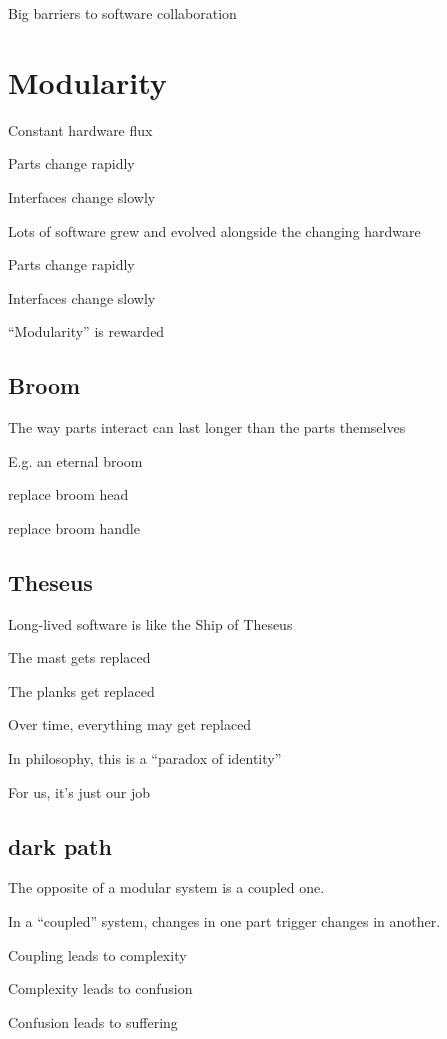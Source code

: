 Big barriers to software collaboration


\section{Modularity}

Constant hardware flux

Parts change rapidly

Interfaces change slowly

Lots of software grew and evolved alongside the changing hardware

Parts change rapidly

Interfaces change slowly

``Modularity'' is rewarded


\subsection{Broom}

The way parts interact can last longer than the parts themselves

E.g. an eternal broom

replace broom head

replace broom handle


\subsection{Theseus}

Long-lived software is like the Ship of Theseus

The mast gets replaced

The planks get replaced

Over time, everything may get replaced

In philosophy, this is a ``paradox of identity''

For us, it's just our job


\subsection{dark path}

The opposite of a modular system is a coupled one.

In a ``coupled'' system, changes in one part trigger changes in another.

Coupling leads to complexity

Complexity leads to confusion

Confusion leads to suffering

